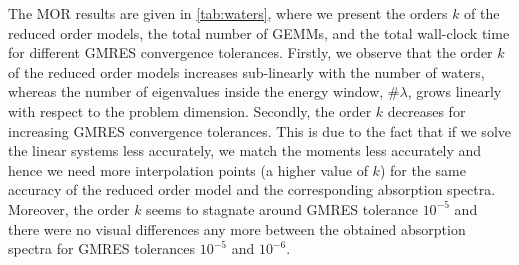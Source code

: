 The MOR results are given in \cref{tab:waters}, where we present the orders $k$ of the reduced order models, the total number of GEMMs, and the total wall-clock time for different GMRES convergence tolerances. Firstly, we observe that the order $k$ of the reduced order models increases sub-linearly with the number of waters, whereas the number of eigenvalues inside the energy window, \#$\lambda$, grows linearly with respect to the problem dimension. Secondly, the order $k$ decreases for increasing GMRES convergence tolerances. This is due to the fact that if we solve the linear systems less accurately, we match the moments less accurately and hence we need more interpolation points (a higher value of $k$) for the same accuracy of the reduced order model and the corresponding absorption spectra. Moreover, the order $k$ seems to stagnate around GMRES tolerance $10^{-5}$ and there were no visual differences any more between the obtained absorption spectra for GMRES tolerances $10^{-5}$ and $10^{-6}$.


